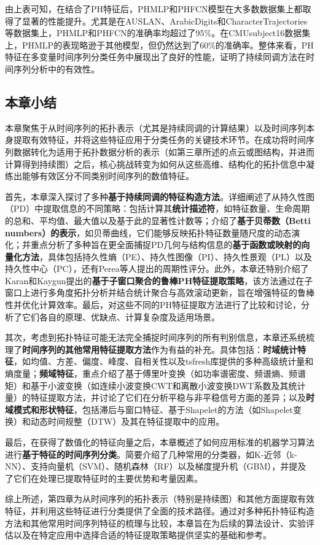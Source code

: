 由上表可知，在结合了PH特征后，PHMLP和PHFCN模型在大多数数据集上都取得了显著的性能提升。尤其是在AUSLAN、ArabicDigits和CharacterTrajectories等数据集上，PHMLP和PHFCN的准确率均超过了95\%。在CMUsubject16数据集上，PHMLP的表现略逊于其他模型，但仍然达到了60\%的准确率。整体来看，PH特征在多变量时间序列分类任务中展现出了良好的性能，证明了持续同调方法在时间序列分析中的有效性。












\subsection{本章小结}
\label{sec:ch4_summary}
本章聚焦于从时间序列的拓扑表示（尤其是持续同调的计算结果）以及时间序列本身提取有效特征，并将这些特征应用于分类任务的关键技术环节。在成功将时间序列数据转化为适用于拓扑数据分析的表示（如第三章所述的点云或图结构，并进而计算得到持续图）之后，核心挑战转变为如何从这些高维、结构化的拓扑信息中凝练出能够有效区分不同类别时间序列的数值特征。

首先，本章深入探讨了多种\textbf{基于持续同调的特征构造方法}。详细阐述了从持久性图（PD）中提取信息的不同策略：包括计算其\textbf{统计描述符}，如特征数量、生命周期的总和、平均值、最大值以及基于此的显著性计数等\cite{mittal2017topological}；介绍了\textbf{基于贝蒂数（Betti numbers）的表示}，如贝蒂曲线，它们能够反映拓扑特征数量随尺度的动态演化\cite{umeda2019topological}；并重点分析了多种旨在更全面捕捉PD几何与结构信息的\textbf{基于函数或映射的向量化方法}，具体包括持久性熵（PE）\cite{atienza2020stability, atienza2018stability}、持久性图像（PI）\cite{adams2017persistence}、持久性景观（PL）\cite{1}以及持久性中心（PC）\cite{JSJC202406009}，还有Perea等人提出的周期性评分。此外，本章还特别介绍了Karan和Kaygun提出的\textbf{基于子窗口聚合的鲁棒PH特征提取策略}\cite{3}，该方法通过在子窗口上进行多角度拓扑分析并结合统计聚合与高效滚动更新，旨在增强特征的鲁棒性并优化计算效率。最后，对这些不同的PH特征提取方法进行了比较和讨论，分析了它们各自的原理、优缺点、计算复杂度及适用场景。

其次，考虑到拓扑特征可能无法完全捕捉时间序列的所有判别信息，本章还系统梳理了\textbf{时间序列的其他常用特征提取方法}作为有益的补充。具体包括：\textbf{时域统计特征}，如均值、方差、偏度、峰度、自相关性以及tsfresh库\cite{christ2018time}提供的多种高级统计量和熵度量；\textbf{频域特征}，重点介绍了基于傅里叶变换（如功率谱密度、频谱熵、频谱矩）和基于小波变换（如连续小波变换CWT和离散小波变换DWT系数及其统计量）的特征提取方法\cite{yi2023survey, rhif2019wavelet}，并讨论了它们在分析平稳与非平稳信号方面的差异；以及\textbf{时域模式和形状特征}，包括滞后与窗口特征、基于Shapelet的方法（如Shapelet变换）和动态时间规整（DTW）及其在特征提取中的应用。

最后，在获得了数值化的特征向量之后，本章概述了如何应用标准的机器学习算法进行\textbf{基于特征的时间序列分类}。简要介绍了几种常用的分类器，如K-近邻（k-NN）、支持向量机（SVM）、随机森林（RF）以及梯度提升机（GBM），并提及了它们在处理已提取特征时的主要优势和考量因素。

综上所述，第四章为从时间序列的拓扑表示（特别是持续图）和其他方面提取有效特征，并利用这些特征进行分类提供了全面的技术路径。通过对多种拓扑特征构造方法和其他常用时间序列特征的梳理与比较，本章旨在为后续的算法设计、实验评估以及在特定应用中选择合适的特征提取策略提供坚实的基础和参考。
